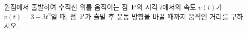 원점에서 출발하여 수직선 위를 움직이는 점~$\mathrm{P}$의 시각 $t$에서의 속도 $v(t)$가 $v(t)=3-3t^2$일 때, 점~$\mathrm{P}$가 출발 후 운동 방향을 바꿀 때까지 움직인 거리를 구하시오.
